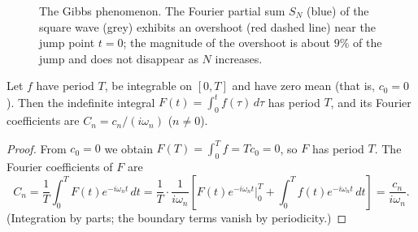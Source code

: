 \begin{figure}[htbp]
\centering
{}
\caption{The Gibbs phenomenon. The Fourier partial sum $S_N$ (blue) of the square wave (grey) exhibits an overshoot (red dashed line) near the jump point $t = 0$; the magnitude of the overshoot is about $9\%$ of the jump and does not disappear as $N$ increases.}
\label{fig:gibbs}
\end{figure}

\begin{property}\label{prop:fourier_integration_preservation}
Let $f$ have period $T$, be integrable on $[0,T]$ and have zero mean (that is, $c_0 = 0$). Then the indefinite integral $F(t) = \int_0^t f(\tau)\,d\tau$ has period $T$, and its Fourier coefficients are $C_n = c_n / (i\omega_n)$ ($n \neq 0$).
\end{property}

\begin{proof}
From $c_0 = 0$ we obtain $F(T) = \int_0^T f = T c_0 = 0$, so $F$ has period $T$. The Fourier coefficients of $F$ are
\[
C_n = \frac{1}{T}\int_0^T F(t) e^{-i\omega_n t}\,dt = \frac{1}{T} \cdot \frac{1}{i\omega_n}\left[ F(t) e^{-i\omega_n t} \Big|_0^T + \int_0^T f(t) e^{-i\omega_n t}\,dt \right] = \frac{c_n}{i\omega_n}.
\]
(Integration by parts; the boundary terms vanish by periodicity.)
\end{proof}

